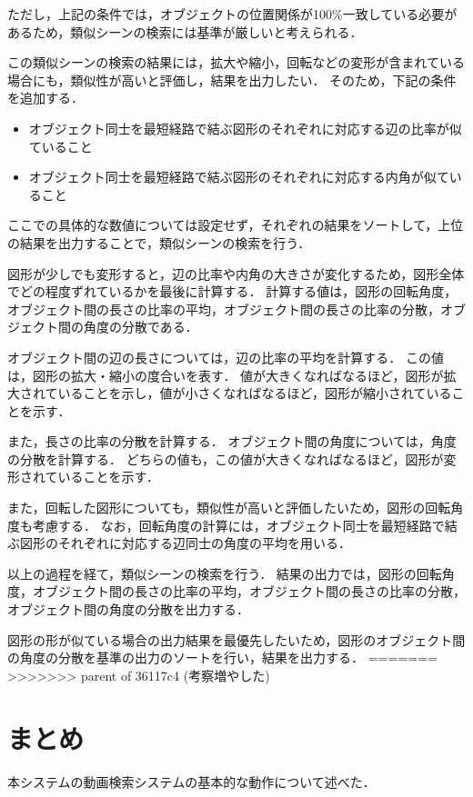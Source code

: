 \documentclass[a4j,12pt,dvipdfmx]{jreport}
\begin{document}
ただし，上記の条件では，オブジェクトの位置関係が100\%一致している必要があるため，類似シーンの検索には基準が厳しいと考えられる．

この類似シーンの検索の結果には，拡大や縮小，回転などの変形が含まれている場合にも，類似性が高いと評価し，結果を出力したい．
そのため，下記の条件を追加する．
\begin{itemize}
  \item オブジェクト同士を最短経路で結ぶ図形のそれぞれに対応する辺の比率が似ていること
  \item オブジェクト同士を最短経路で結ぶ図形のそれぞれに対応する内角が似ていること
\end{itemize}
ここでの具体的な数値については設定せず，それぞれの結果をソートして，上位の結果を出力することで，類似シーンの検索を行う．

図形が少しでも変形すると，辺の比率や内角の大きさが変化するため，図形全体でどの程度ずれているかを最後に計算する．
計算する値は，図形の回転角度，オブジェクト間の長さの比率の平均，オブジェクト間の長さの比率の分散，オブジェクト間の角度の分散である．

オブジェクト間の辺の長さについては，辺の比率の平均を計算する．
この値は，図形の拡大・縮小の度合いを表す．
値が大きくなればなるほど，図形が拡大されていることを示し，値が小さくなればなるほど，図形が縮小されていることを示す．

また，長さの比率の分散を計算する．
オブジェクト間の角度については，角度の分散を計算する．
どちらの値も，この値が大きくなればなるほど，図形が変形されていることを示す．

また，回転した図形についても，類似性が高いと評価したいため，図形の回転角度も考慮する．
なお，回転角度の計算には，オブジェクト同士を最短経路で結ぶ図形のそれぞれに対応する辺同士の角度の平均を用いる．

以上の過程を経て，類似シーンの検索を行う．
結果の出力では，図形の回転角度，オブジェクト間の長さの比率の平均，オブジェクト間の長さの比率の分散，オブジェクト間の角度の分散を出力する．

図形の形が似ている場合の出力結果を最優先したいため，図形のオブジェクト間の角度の分散を基準の出力のソートを行い，結果を出力する．
=======
>>>>>>> parent of 36117c4 (考察増やした)

\section{まとめ}
本システムの動画検索システムの基本的な動作について述べた．

\clearpage
\end{document}
